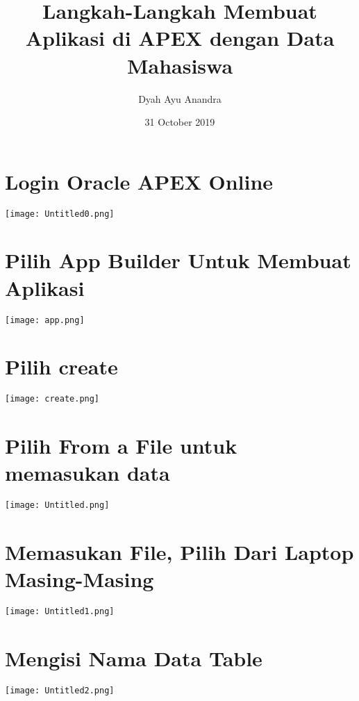 \documentclass{article}
\title{Langkah-Langkah Membuat Aplikasi di APEX dengan Data Mahasiswa}
\author{Dyah Ayu Anandra }
\date{31 October 2019}
\begin{document}
\maketitle

\section{Login Oracle APEX Online}
\begin{center}
    \texttt{[image: Untitled0.png]}
\end{center}

\section{Pilih App Builder Untuk Membuat Aplikasi}
\begin{center}
    \texttt{[image: app.png]}
\end{center}

\section{Pilih create}
\begin{center}
    \texttt{[image: create.png]}
\end{center}

\section{Pilih From a File untuk memasukan data}
\begin{center}
    \texttt{[image: Untitled.png]}
\end{center}

\section{Memasukan File, Pilih Dari Laptop Masing-Masing}
\begin{center}
    \texttt{[image: Untitled1.png]}
\end{center}

\section{Mengisi Nama Data Table}
\begin{center}
    \texttt{[image: Untitled2.png]}
\end{center}
\end{document}
